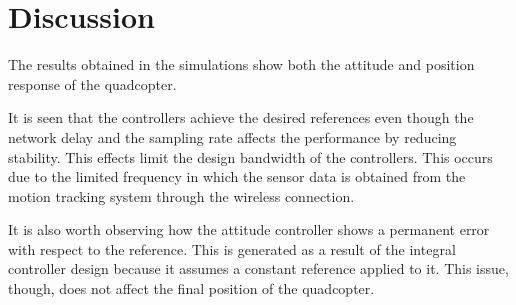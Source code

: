 \section{Discussion}\label{sec:discussion}
The results obtained in the simulations show both the attitude and position response of the quadcopter. 

It is seen that the controllers achieve the desired references even though the network delay and the sampling rate affects the performance by reducing stability. This effects limit the design bandwidth of the controllers. This occurs due to the limited frequency in which the sensor data is obtained from the motion tracking system through the wireless connection.

It is also worth observing how the attitude controller shows a permanent error with respect to the reference. This is generated as a result of the integral controller design because it assumes a constant reference applied to it. This issue, though, does not affect the final position of the quadcopter.